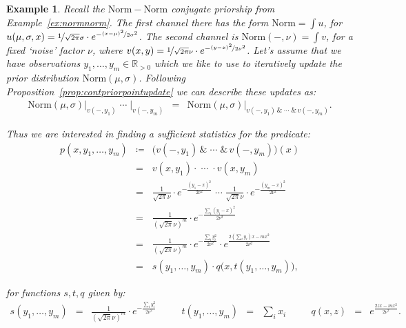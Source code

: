 \documentclass{mscs}
\newcommand{\R}{\mathbb{R}}
\newcommand{\andthen}{\ensuremath{\mathrel{\&}}}
\newcommand{\normchan}{\ensuremath{\mathrm{Norm}}}
\newtheorem{example}[theorem]{Example}
\begin{document}
\begin{example}
\label{ex:normnormstat}
Recall the $\normchan - \normchan$ conjugate priorship from
Example~\ref{ex:normnorm}. The first channel there has the form
$\normchan = \int u$, for $u(\mu,\sigma,x) =
\nicefrac{1}{\sqrt{2\pi}\sigma}\cdot
e^{-\nicefrac{(x-\mu)^{2}}{2\sigma^2}}$. The second channel is
$\normchan(-,\nu) = \int v$, for a fixed `noise' factor $\nu$, where
$v(x,y) = \nicefrac{1}{\sqrt{2\pi}\nu}\cdot
e^{-\nicefrac{(y-x)^{2}}{2\nu^2}}$. Let's assume that we have
observations $y_{1}, \ldots, y_{m} \in \R_{> 0}$ which we like to use
to iteratively update the prior distribution $\normchan(\mu,\sigma)$.
Following Proposition~\ref{prop:contpriorpointupdate} we
can describe these updates as:
\[ \begin{array}{rcl}
\normchan(\mu,\sigma)\big|_{v(-,y_1)} \;\cdots\; \big|_{v(-,y_m)}
& = &
\normchan(\mu,\sigma)\big|_{v(-,y_1) \,\andthen \;\cdots\; \andthen\,v(-,y_m)}.
\end{array} \]

\noindent Thus we are interested in finding a sufficient statistics
for the predicate:
\[ \begin{array}{rcl}
p(x,y_{1}, \ldots, y_{m})
& \coloneqq &
\Big(v(-,y_1) \,\andthen \;\cdots\; \andthen\,v(-,y_m)\Big)(x)
\\
& = &
v(x,y_{1}) \cdot \;\cdots\; \cdot v(x,y_{m})
\\
& = &
\frac{1}{\sqrt{2\pi}\nu}\cdot e^{-\frac{(y_{1}-x)^{2}}{2\nu^{2}}} \;\cdots\;
   \frac{1}{\sqrt{2\pi}\nu}\cdot e^{-\frac{(y_{m}-x)^{2}}{2\nu^{2}}}
\\
& = &
\frac{1}{(\sqrt{2\pi}\nu)^{m}}\cdot e^{-\frac{\sum_{i}(y_{i}-x)^{2}}{2\nu^2}}
\\
& = &
\frac{1}{(\sqrt{2\pi}\nu)^{m}}\cdot e^{-\frac{\sum_{i}y_{i}^{2}}{2\nu^2}}
   \cdot e^{\frac{2(\sum_{i}y_{i})x-mx^{2}}{2\nu^2}}
\\
& = &
s(y_{1}, \ldots, y_{m}) \cdot q\big(x, t(y_{1}, \ldots, y_{m})\big),
\end{array} \]

\noindent for functions $s,t,q$ given by:
\[ \begin{array}{rclcrclcrcl}
s(y_{1}, \ldots, y_{m}) 
& = &
\frac{1}{(\sqrt{2\pi}\nu)^{m}}\cdot e^{-\frac{\sum_{i}y_{i}^{2}}{2\nu^2}}
& \quad &
t(y_{1}, \ldots, y_{m})
& = &
\sum_{i}x_{i}
& \quad &
q(x, z)
& = &
e^{\frac{2zx-mx^{2}}{2\nu^2}}.
\end{array} \]



\end{example}
\end{document}

